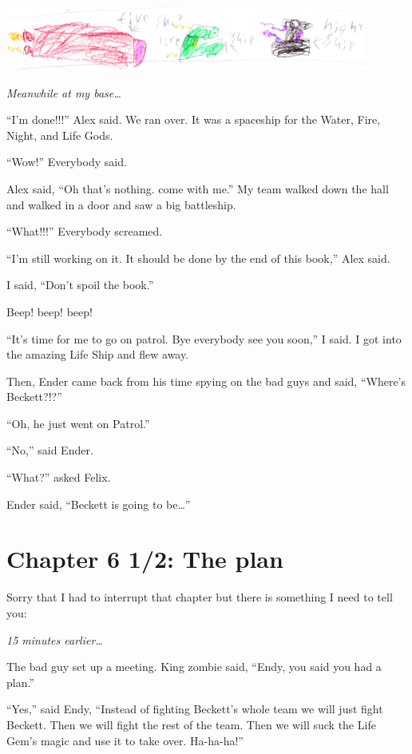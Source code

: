 \documentclass[12pt,oneside]{krantz}
\begin{document}
\includegraphics[width=4.6875in,height=\textheight]{img/threeships.jpg}

\emph{Meanwhile at my base\ldots{}}

``I'm done!!!'' Alex said. We ran over. It was a spaceship for the
Water, Fire, Night, and Life Gods.

``Wow!'' Everybody said.

Alex said, ``Oh that's nothing. come with me.'' My team walked down the
hall and walked in a door and saw a big battleship.

``What!!!'' Everybody screamed.

``I'm still working on it. It should be done by the end of this book,''
Alex said.

I said, ``Don't spoil the book.''

Beep! beep! beep!

``It's time for me to go on patrol. Bye everybody see you soon,'' I
said. I got into the amazing Life Ship and flew away.

Then, Ender came back from his time spying on the bad guys and said,
``Where's Beckett?!?''

``Oh, he just went on Patrol.''

``No,'' said Ender.

``What?'' asked Felix.

Ender said, ``Beckett is going to be\ldots{}''

\hypertarget{chapter-6-12-the-plan}{%
\chapter*{Chapter 6 1/2: The plan}\label{chapter-6-12-the-plan}}


Sorry that I had to interrupt that chapter but there is something I need
to tell you:

\emph{15 minutes earlier\ldots{}}

The bad guy set up a meeting. King zombie said, ``Endy, you said you had
a plan.''

``Yes,'' said Endy, ``Instead of fighting Beckett's whole team we will
just fight Beckett. Then we will fight the rest of the team. Then we
will suck the Life Gem's magic and use it to take over. Ha-ha-ha!''
\end{document}
